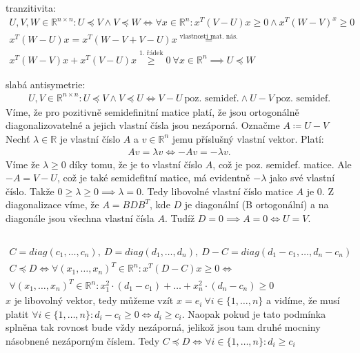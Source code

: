 \documentclass[12pt, a4paper]{article}
\begin{document}
tranzitivita:
\begin{gather*}
U,V,W \in \mathbb{R}^{n \times n}: U \preceq V \land V \preceq W \iff \forall x \in \mathbb{R}^n: x^T(V-U)x \geq 0 \land x^T(W-V)^x \geq 0\\
x^T(W-U)x = x^T(W-V+V-U)x \stackrel{\text{vlastnosti mat. nás.}}{=}\\
x^T(W-V)x + x^T(V-U)x \stackrel{\text{1. řádek}}{\geq} 0\ \forall x \in \mathbb{R}^n \implies U \preceq W
\end{gather*}

slabá antisymetrie:
\begin{gather*}
U,V \in \mathbb{R}^{n \times n}: U \preceq V \land V \preceq U \iff V-U \ \text{poz. semidef.} \land U-V \ \text{poz. semidef.} 
\end{gather*}
Víme, že pro pozitivně semidefinitní matice platí, že jsou ortogonálně diagonalizovatelné a jejich vlastní čísla jsou nezáporná. Označme $A \coloneqq U - V$
Nechť $\lambda \in \mathbb{R}$ je vlastní číslo $A$ a $v \in \mathbb{R}^n$ jemu příslušný vlastní vektor. Platí:
\begin{gather*}
Av=\lambda v \iff -Av = - \lambda v.
\end{gather*}
Víme že $\lambda \geq 0$ díky tomu, že je to vlastní číslo $A$, což je poz. semidef. matice. Ale $-A = V-U$, což je také semidefitní matice, má evidentně $-\lambda$ jako své vlastní číslo. Takže $0 \geq \lambda \geq 0 \implies \lambda = 0$. Tedy libovolné vlastní číslo matice $A$ je 0. Z diagonalizace víme, že $A = BDB^T$, kde $D$ je diagonální (B ortogonální) a na diagonále jsou všechna vlastní čísla $A$. Tudíž $D=0 \implies A=0 \iff U = V$.

\subsection{}
\begin{gather*}
C = diag(c_1,\dots, c_n),\ D = diag(d_1,\dots, d_n),\ D-C=diag(d_1-c_1,\dots, d_n-c_n)\\
C \preceq D \iff \forall (x_1,\dots, x_n)^T \in \mathbb{R}^n: x^T(D-C)x \geq 0 \iff \\
\forall (x_1,\dots, x_n)^T \in \mathbb{R}^n: x_1^2 \cdot (d_1-c_1) + \dots + x_n^2 \cdot (d_n-c_n) \geq 0
\end{gather*}
$x$ je libovolný vektor, tedy můžeme vzít $x = e_i \ \forall i \in \{1,\dots,n\}$ a vidíme, že musí platit $\forall i \in \{1,\dots,n\}: d_i-c_i \geq 0 \iff d_i \geq c_i$. Naopak pokud je tato podmínka splněna tak rovnost bude vždy nezáporná, jelikož jsou tam druhé mocniny násobnené nezáporným číslem. Tedy $C \preceq D \iff \forall i \in \{1,\dots,n\}: d_i \geq c_i$
\end{document}
